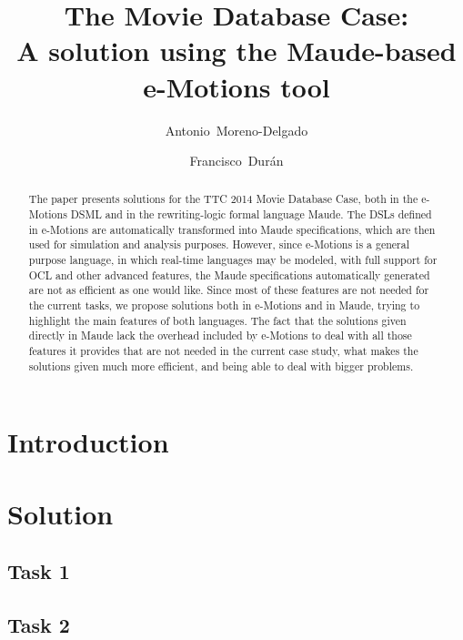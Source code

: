 \documentclass[draft]{llncs}
\title{The Movie Database Case: \\ A solution using the Maude-based e-Motions tool}
\author{Antonio~Moreno-Delgado \and Francisco~Dur\'an}
\institute{
    University of M\'alaga\\
    \email{\{amoreno,duran\}@lcc.uma.es}
    }
\begin{document}
\maketitle

\begin{abstract}
The paper presents solutions for the TTC 2014 Movie Database Case, both in the e-Motions DSML and in the rewriting-logic formal language Maude. The DSLs defined in e-Motions are automatically transformed into Maude specifications, which are then used for simulation and analysis purposes. However, since e-Motions is a general purpose language, in which real-time languages may be modeled, with full support for OCL and other advanced features, the Maude specifications automatically generated are not as efficient as one would like. Since most of these features are not needed for the current tasks, we propose solutions both in e-Motions and in Maude, trying to highlight the main features of both languages. The fact that the solutions given directly in Maude lack the overhead included by e-Motions to deal with all those features it provides that are not needed in the current case study, what makes the solutions given much more efficient, and being able to deal with bigger problems. 
\end{abstract}

\section{Introduction}
\label{sec:intro}


\section{Solution}
\label{sec:solution}


\subsection{Task 1}
\label{sub:task1}


\subsection{Task 2}
\label{sub:task2}

\end{document}
